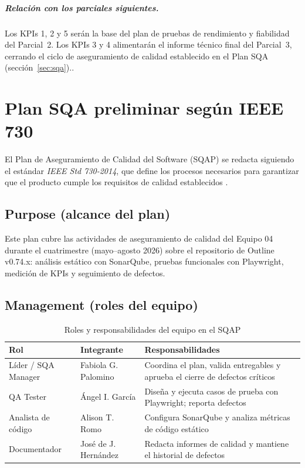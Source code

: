 \documentclass{report}
\begin{document}
\paragraph{Relación con los parciales siguientes.}
Los KPIs 1, 2 y 5 serán la base del plan de pruebas de rendimiento y
fiabilidad del Parcial~2. Los KPIs 3 y 4 alimentarán el informe técnico final
del Parcial~3, cerrando el ciclo de aseguramiento de calidad establecido en
el Plan SQA (sección~\ref{sec:sqa})..
\newpage

\chapter*{Plan SQA preliminar según IEEE 730}

El Plan de Aseguramiento de Calidad del Software (SQAP) se redacta siguiendo el estándar \textit{IEEE Std 730-2014}, que define los procesos necesarios para garantizar que el producto cumple los requisitos de calidad establecidos \cite{pressman2020}.

\section*{Purpose (alcance del plan)}

Este plan cubre las actividades de aseguramiento de calidad del Equipo 04 durante el cuatrimestre (mayo--agosto 2026) sobre el repositorio de Outline v0.74.x: análisis estático con SonarQube, pruebas funcionales con Playwright, medición de KPIs y seguimiento de defectos.

\section*{Management (roles del equipo)}

\begin{table}[h]
\centering
\begin{tabular}{|p{3.5cm}|p{3cm}|p{7cm}|}
\hline
\textbf{Rol} & \textbf{Integrante} & \textbf{Responsabilidades} \\
\hline
Líder / SQA Manager & Fabiola G. Palomino & Coordina el plan, valida entregables y aprueba el cierre de defectos críticos \\
\hline
QA Tester & Ángel I. García & Diseña y ejecuta casos de prueba con Playwright; reporta defectos \\
\hline
Analista de código & Alison T. Romo & Configura SonarQube y analiza métricas de código estático \\
\hline
Documentador & José de J. Hernández & Redacta informes de calidad y mantiene el historial de defectos \\
\hline
\end{tabular}
\caption{Roles y responsabilidades del equipo en el SQAP}
\end{table}
\end{document}
